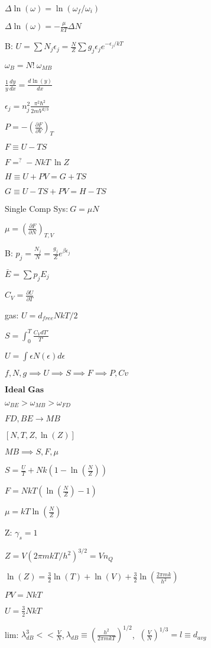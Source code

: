 \documentclass{article}
\begin{document}
\begin{multicols}{3}
$\Delta \ln(\omega) = \ln(\omega_f / \omega_i)$

$\Delta \ln(\omega)=-\frac{\mu}{kT}\Delta N$

B: $U=\sum N_j \epsilon_j = \frac{N}{Z} \sum g_j \epsilon_j e^{-\epsilon_j / kT}$

$\omega_B=N!\: \omega_{MB}$

$\frac{1}{y} \frac{dy}{dx} = \frac{d\ln(y)}{dx}$

$\epsilon_j=n_j^2 \frac{\pi^2 \hbar^2}{2mV^{2/3}}$

$P=-\left (\frac{\partial F}{\partial V}\right )_T$

$F\equiv U-TS$

$F=^? -NkT\:\ln Z$

$H \equiv U+PV = G+TS$

$G \equiv U-TS+PV = H-TS$

Single Comp Sys:$\:G=\mu N$

$\mu = \left ( \frac{\partial F}{\partial N} \right )_{T,V}$

B: $p_j=\frac{N_j}{N}=\frac{g_j}{Z}e^{\beta \epsilon_j}$

$\bar{E}=\sum p_j E_j$

$C_V=\frac{\partial U}{\partial T}$

gas: $U=d_{free}NkT/2$

$S=\int_0^T \frac{C_V dT'}{T'}$

$U=\int \epsilon N(\epsilon) d\epsilon$

$f,N,g\implies U\implies S\implies F\implies P,Cv$

$\textbf{Ideal Gas}$

$\omega_{BE}> \omega_{MB} > \omega_{FD}$

$FD,BE \rightarrow MB$

$[N,T,Z,\ln(Z)]$

$MB \implies S,F,\mu$

$S=\frac{U}{T}+Nk (1-\ln( \frac{N}{Z} ) )$

$F=NkT (\ln ( \frac{N}{Z} ) -1 )$

$\mu=kT \ln ( \frac{N}{Z} )$

Z: $\gamma_s=1$

$Z=V(2\pi mkT/h^2)^{3/2}=Vn_Q$

$\ln(Z)=\frac{3}{2}\ln(T)+\ln(V)+\frac{3}{2}\ln \left ( \frac{2 \pi m k}{h^2} \right )$

$PV=NkT$

$U=\frac{3}{2}NkT$

lim: $\lambda_{dB}^3<<\frac{V}{N}$,$\:\lambda_{dB} \equiv \left ( \frac{h^2}{2 \pi mkT} \right )^{1/2}$, $\: (\frac{V}{N})^{1/3}=l\equiv 
d_{avg}$


\end{multicols}
\end{document}
